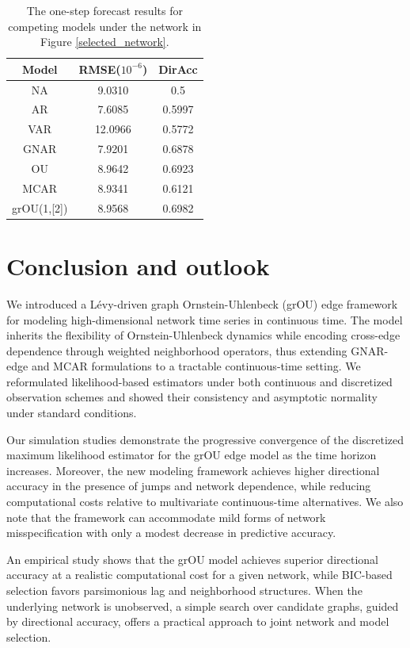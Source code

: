 \documentclass[12pt]{amsart}
\numberwithin{equation}{section}
\newcommand{\1}{\mathbf{1}}
\begin{document}
\begin{table}[htbp]
\centering
\begin{tabular}{|c|cc|}
\hline
Model & RMSE($10^{-6}$) & DirAcc\\ 
\hline
NA & 9.0310 & 0.5\\
AR & 7.6085 & 0.5997\\
VAR & 12.0966 & 0.5772\\
GNAR & 7.9201 & 0.6878\\
OU & 8.9642 & 0.6923\\
MCAR & 8.9341 & 0.6121\\
grOU(1,[2]) & 8.9568 & 0.6982\\

\hline
\end{tabular}
\caption{The one-step forecast results for competing models under the network in Figure \ref{selected_network}.}
\label{table_pred2}
\end{table}

\section{Conclusion and outlook}
\label{Conclusion and Outlook}
We introduced a L\'evy-driven graph Ornstein-Uhlenbeck (grOU) edge framework for modeling high-dimensional network time series in continuous time. The model inherits the flexibility of Ornstein-Uhlenbeck dynamics while encoding cross-edge dependence through weighted neighborhood operators, thus extending GNAR-edge and MCAR formulations to a tractable continuous-time setting. We reformulated likelihood-based estimators under both continuous and discretized observation schemes and showed their consistency and asymptotic normality under standard conditions. 

Our simulation studies demonstrate the progressive convergence of the discretized maximum likelihood estimator for the grOU edge model as the time horizon increases. Moreover, the new modeling framework achieves higher directional accuracy in the presence of jumps and network dependence, while reducing computational costs relative to multivariate continuous-time alternatives. We also note that the framework can accommodate mild forms of network misspecification with only a modest decrease in predictive accuracy.

An empirical study shows that the grOU model achieves superior directional accuracy at a realistic computational cost for a given network, while BIC-based selection favors parsimonious lag and neighborhood structures. When the underlying network is unobserved, a simple search over candidate graphs, guided by directional accuracy, offers a practical approach to joint network and model selection.
\end{document}
